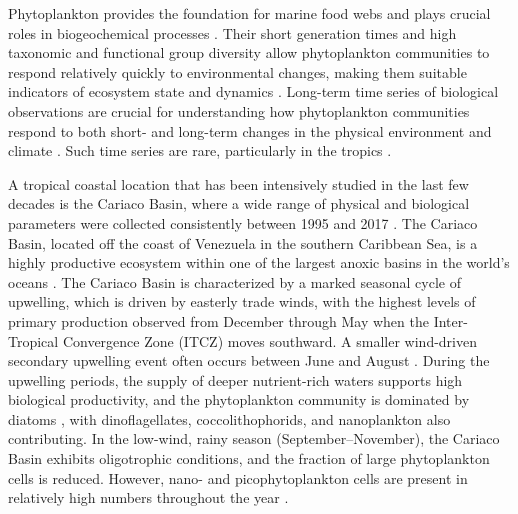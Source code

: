 \documentclass[]{agujournal2019}
\begin{document}
Phytoplankton provides the foundation for marine food webs and plays crucial roles in biogeochemical processes \cite{falkowski_biogeochemical_1998}. Their short generation times and high taxonomic and functional group diversity allow phytoplankton communities to respond relatively quickly to environmental changes, making them suitable indicators of ecosystem state and dynamics \cite{alvarez-cobelas_what_1998, barton_anthropogenic_2016, di_cavalho_temporal_2023}. Long-term time series of biological observations are crucial for understanding how phytoplankton communities respond to both short- and long-term changes in the physical environment and climate \cite{carstensen_need_2014, henson_observing_2016}. Such time series are rare, particularly in the tropics \cite{clarke_does_2017}. 

A tropical coastal location that has been intensively studied in the last few decades is the Cariaco Basin, where a wide range of physical and biological parameters were collected consistently between 1995 and 2017 \cite{muller-karger_scientific_2019}. The Cariaco Basin, located off the coast of Venezuela in the southern Caribbean Sea, is a highly productive ecosystem within one of the largest anoxic basins in the world's oceans \cite{edgcomb_accessing_2011}. The Cariaco Basin is characterized by a marked seasonal cycle of upwelling, which is driven by easterly trade winds, with the highest levels of primary production observed from December through May when the Inter-Tropical Convergence Zone (ITCZ) moves southward. A smaller wind-driven secondary upwelling event often occurs between June and August \cite{mullerkarger_annual_2001, astor_seasonal_2003}. During the upwelling periods, the supply of deeper nutrient-rich waters supports high biological productivity, and the phytoplankton community is dominated by diatoms \cite{romero_seasonal_2009}, with dinoflagellates, coccolithophorids, and nanoplankton also contributing. In the low-wind, rainy season (September–November), the Cariaco Basin exhibits oligotrophic conditions, and the fraction of large phytoplankton cells is reduced. However, nano- and picophytoplankton cells are present in relatively high numbers throughout the year \cite{lorenzoni_characterization_2015}.    
\end{document}

